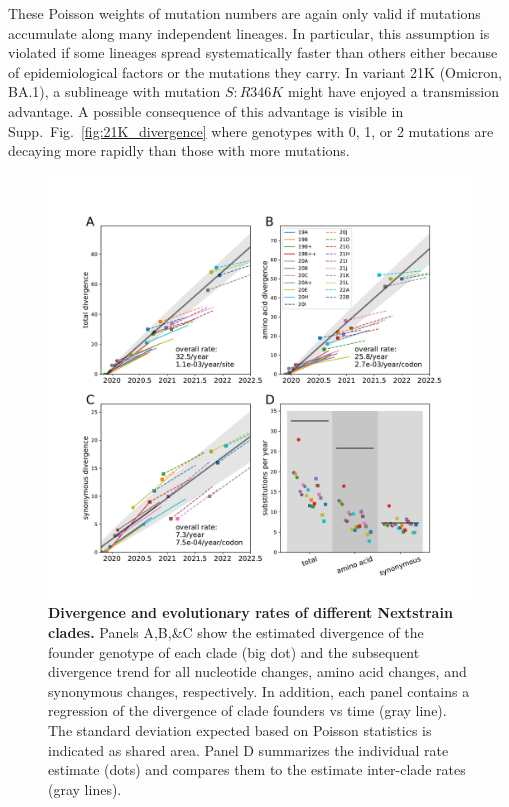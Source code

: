\documentclass[aps,rmp, twocolumn]{revtex4}
\begin{document}
These Poisson weights of mutation numbers are again only valid if mutations accumulate along many independent lineages.
In particular, this assumption is violated if some lineages spread systematically faster than others either because of epidemiological factors or the mutations they carry.
In variant 21K (Omicron, BA.1), a sublineage with mutation $S:R346K$ might have enjoyed a transmission advantage.
A possible consequence of this advantage is visible in Supp.~Fig.~\ref{fig:21K_divergence} where genotypes with 0, 1, or 2 mutations are decaying more rapidly than those with more mutations.

\begin{figure}
    \includegraphics[width=\textwidth]{figures/rate_summary.pdf}
    \caption[]{{\bf Divergence and evolutionary rates of different Nextstrain clades.} Panels A,B,\&C show the estimated divergence of the founder genotype of each clade (big dot) and the subsequent divergence trend for all nucleotide changes, amino acid changes, and synonymous changes, respectively. In addition, each panel contains a regression of the divergence of clade founders vs time (gray line).
    The standard deviation expected based on Poisson statistics is indicated as shared area.
    Panel D summarizes the individual rate estimate (dots) and compares them to the estimate inter-clade rates (gray lines).
    \label{fig:rate_summary} }
\end{figure}
\end{document}
